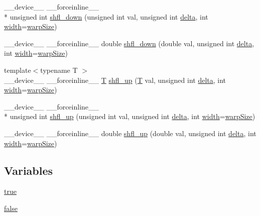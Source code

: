 \begin{DoxyCompactItemize}
\item 
\-\_\-\-\_\-device\-\_\-\-\_\- \-\_\-\-\_\-forceinline\-\_\-\-\_\- \\*
unsigned int \hyperlink{namespacecv_1_1gpu_1_1device_a10442f7250f16379026cc8f9111e2892}{shfl\-\_\-down} (unsigned int val, unsigned int \hyperlink{legacy_8hpp_ac867054f00f4be8b1f3ebce6fba31982}{delta}, int \hyperlink{highgui__c_8h_a2474a5474cbff19523a51eb1de01cda4}{width}=\hyperlink{legacy_8hpp_aa80dc9d8702386dac7fbb06311306e4f}{warp\-Size})
\item 
\-\_\-\-\_\-device\-\_\-\-\_\- \-\_\-\-\_\-forceinline\-\_\-\-\_\- double \hyperlink{namespacecv_1_1gpu_1_1device_a337bc8eabc5093eaad019c30ea80f53a}{shfl\-\_\-down} (double val, unsigned int \hyperlink{legacy_8hpp_ac867054f00f4be8b1f3ebce6fba31982}{delta}, int \hyperlink{highgui__c_8h_a2474a5474cbff19523a51eb1de01cda4}{width}=\hyperlink{legacy_8hpp_aa80dc9d8702386dac7fbb06311306e4f}{warp\-Size})
\item 
{\footnotesize template$<$typename T $>$ }\\\-\_\-\-\_\-device\-\_\-\-\_\- \-\_\-\-\_\-forceinline\-\_\-\-\_\- \hyperlink{calib3d_8hpp_a3efb9551a871ddd0463079a808916717}{T} \hyperlink{namespacecv_1_1gpu_1_1device_aef8a737a22483c1fbc7224718c19fc47}{shfl\-\_\-up} (\hyperlink{calib3d_8hpp_a3efb9551a871ddd0463079a808916717}{T} val, unsigned int \hyperlink{legacy_8hpp_ac867054f00f4be8b1f3ebce6fba31982}{delta}, int \hyperlink{highgui__c_8h_a2474a5474cbff19523a51eb1de01cda4}{width}=\hyperlink{legacy_8hpp_aa80dc9d8702386dac7fbb06311306e4f}{warp\-Size})
\item 
\-\_\-\-\_\-device\-\_\-\-\_\- \-\_\-\-\_\-forceinline\-\_\-\-\_\- \\*
unsigned int \hyperlink{namespacecv_1_1gpu_1_1device_a6f2856d8193833356d21ab8ee120284b}{shfl\-\_\-up} (unsigned int val, unsigned int \hyperlink{legacy_8hpp_ac867054f00f4be8b1f3ebce6fba31982}{delta}, int \hyperlink{highgui__c_8h_a2474a5474cbff19523a51eb1de01cda4}{width}=\hyperlink{legacy_8hpp_aa80dc9d8702386dac7fbb06311306e4f}{warp\-Size})
\item 
\-\_\-\-\_\-device\-\_\-\-\_\- \-\_\-\-\_\-forceinline\-\_\-\-\_\- double \hyperlink{namespacecv_1_1gpu_1_1device_a2e236b2f86969acb8de8f6f6e17a4604}{shfl\-\_\-up} (double val, unsigned int \hyperlink{legacy_8hpp_ac867054f00f4be8b1f3ebce6fba31982}{delta}, int \hyperlink{highgui__c_8h_a2474a5474cbff19523a51eb1de01cda4}{width}=\hyperlink{legacy_8hpp_aa80dc9d8702386dac7fbb06311306e4f}{warp\-Size})
\end{DoxyCompactItemize}
\subsection*{Variables}
\begin{DoxyCompactItemize}
\item 
\hyperlink{namespacecv_1_1gpu_1_1device_ac34c172a7a1904fb0fd477321a31f926}{true}
\item 
\hyperlink{namespacecv_1_1gpu_1_1device_af8d6418be1712e83b4f398e7e7273026}{false}
\end{DoxyCompactItemize}


